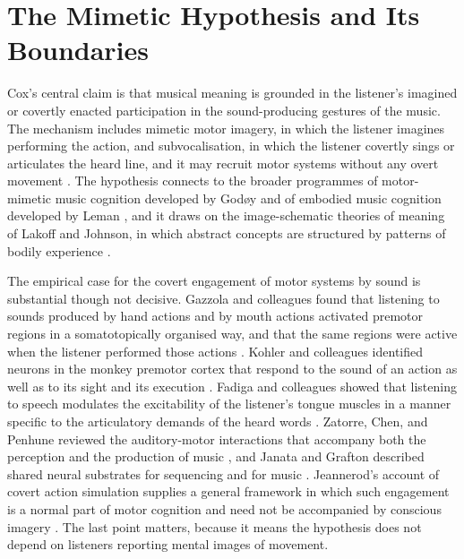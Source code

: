 \documentclass[11pt]{article}
\theoremstyle{plain}
\theoremstyle{definition}
\begin{document}
\section{The Mimetic Hypothesis and Its Boundaries}\label{sec:mimetic}

Cox's central claim is that musical meaning is grounded in the listener's imagined or covertly enacted participation in the sound-producing gestures of the music. The mechanism includes mimetic motor imagery, in which the listener imagines performing the action, and subvocalisation, in which the listener covertly sings or articulates the heard line, and it may recruit motor systems without any overt movement \citep{cox2016}. The hypothesis connects to the broader programmes of motor-mimetic music cognition developed by Godøy and of embodied music cognition developed by Leman \citep{godoy2003,godoy2010,leman2007}, and it draws on the image-schematic theories of meaning of Lakoff and Johnson, in which abstract concepts are structured by patterns of bodily experience \citep{lakoff1980}.

The empirical case for the covert engagement of motor systems by sound is substantial though not decisive. Gazzola and colleagues found that listening to sounds produced by hand actions and by mouth actions activated premotor regions in a somatotopically organised way, and that the same regions were active when the listener performed those actions \citep{gazzola2006}. Kohler and colleagues identified neurons in the monkey premotor cortex that respond to the sound of an action as well as to its sight and its execution \citep{kohler2002}. Fadiga and colleagues showed that listening to speech modulates the excitability of the listener's tongue muscles in a manner specific to the articulatory demands of the heard words \citep{fadiga2002}. Zatorre, Chen, and Penhune reviewed the auditory-motor interactions that accompany both the perception and the production of music \citep{zatorre2007}, and Janata and Grafton described shared neural substrates for sequencing and for music \citep{janata2003}. Jeannerod's account of covert action simulation supplies a general framework in which such engagement is a normal part of motor cognition and need not be accompanied by conscious imagery \citep{jeannerod2001}. The last point matters, because it means the hypothesis does not depend on listeners reporting mental images of movement.
\end{document}
